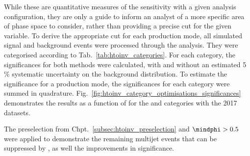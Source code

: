 While these are quantitative measures of the sensitivity with a given analysis configuration, they are only a guide to inform an analyst of a more specific area of phase space to consider, rather than providing a precise cut for the given variable. To derive the appropriate cut for each production mode, all simulated signal and background events were processed through the analysis. They were categorised according to Tab.~\ref{tab:htoinv_categories}. For each category, the significances for both methods were calculated, with and without an estimated 5\,\% systematic uncertainty on the background distribution. To estimate the significance for a production mode, the significances for each category were summed in quadrature. Fig.~\ref{fig:htoinv_category_optimisations_significances} demonstrates the results as a function of \omegaTilde for the \ttH and \VH categories with the 2017 datasets.

The preselection from Chpt.~\ref{subsec:htoinv_preselection} and $\mindphi > \text{0.5}$ were applied to demonstrate the remaining multijet events that can be suppressed by \omegaTilde, as well the improvements in significance.

